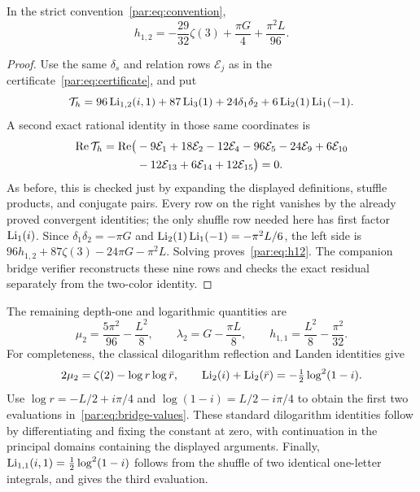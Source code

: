 \begin{lemma}\label{par:lem:h12}
In the strict convention~\eqref{par:eq:convention},
\begin{equation}\label{par:eq:h12}
 h_{1,2}=-\frac{29}{32}\zeta(3)+\frac{\pi G}{4}
                         +\frac{\pi^2L}{96}.
\end{equation}
\end{lemma}
\begin{proof}
Use the same $\delta_s$ and relation rows $\mathcal E_j$ as in
the certificate~\eqref{par:eq:certificate}, and put
\[
 \mathcal T_h=96\operatorname{Li}_{1,2}(i,1)+87\operatorname{Li}_3(1)
                +24\delta_1\delta_2+6\operatorname{Li}_2(1)\operatorname{Li}_1(-1).
\]
A second exact rational identity in those same coordinates is
\begin{align}\label{par:eq:h12-certificate}
 \operatorname{Re}\mathcal T_h
 =\operatorname{Re}\bigl(&-9\mathcal E_1+18\mathcal E_2
 -12\mathcal E_4-96\mathcal E_5-24\mathcal E_9
 +6\mathcal E_{10}\notag\\
 &-12\mathcal E_{13}+6\mathcal E_{14}+12\mathcal E_{15}\bigr)=0.
\end{align}
As before, this is checked just by expanding the displayed definitions,
stuffle products, and conjugate pairs. Every row on the right vanishes
by the already proved convergent identities; the only shuffle row
needed here has first factor $\operatorname{Li}_1(i)$.
Since $\delta_1\delta_2=-\pi G$ and
$\operatorname{Li}_2(1)\operatorname{Li}_1(-1)=-\pi^2L/6$, the left side is
$96h_{1,2}+87\zeta(3)-24\pi G-\pi^2L$.
Solving proves~\eqref{par:eq:h12}. The companion bridge verifier
reconstructs these nine rows and checks the exact residual separately
from the two-color identity.
\end{proof}

The remaining depth-one and logarithmic quantities are
\begin{equation}\label{par:eq:bridge-values}
 \mu_2=\frac{5\pi^2}{96}-\frac{L^2}{8},\qquad
 \lambda_2=G-\frac{\pi L}{8},\qquad
 h_{1,1}=\frac{L^2}{8}-\frac{\pi^2}{32}.
\end{equation}
For completeness, the classical dilogarithm reflection and Landen
identities \cite{okudaueno} give
\[
 2\mu_2=\zeta(2)-\log r\log\bar r,
 \qquad
 \operatorname{Li}_2(i)+\operatorname{Li}_2(\bar r)=-\tfrac12\log^2(1-i).
\]
Use $\log r=-L/2+i\pi/4$ and $\log(1-i)=L/2-i\pi/4$
to obtain the first two evaluations in~\eqref{par:eq:bridge-values}.
These standard dilogarithm identities follow by differentiating and
fixing the constant at zero, with continuation in the principal domains
containing the displayed arguments. Finally,
$\operatorname{Li}_{1,1}(i,1)=\tfrac12\log^2(1-i)$ follows from the shuffle of
two identical one-letter integrals, and gives the third evaluation.


